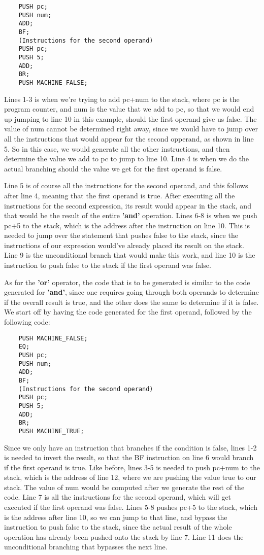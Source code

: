 \documentclass{article}
\begin{document}
\begin{lstlisting}
    PUSH pc;
    PUSH num;
    ADD;
    BF;
    (Instructions for the second operand)
    PUSH pc;
    PUSH 5;
    ADD;
    BR;
    PUSH MACHINE_FALSE;
\end{lstlisting}

Lines 1-3 is when we're trying to add pc+num to the stack, where pc is the program counter, and num is the value that we add to pc, so that we would end up jumping to line 10 in this example, should the first operand give us false. The value of num cannot be determined right away, since we would have to jump over all the instructions that would appear for the second opperand, as shown in line 5. So in this case, we would generate all the other instructions, and then determine the value we add to pc to jump to line 10. Line 4 is when we do the actual branching should the value we get for the first operand is false.

Line 5 is of course all the instructions for the second operand, and this follows after line 4, meaning that the first operand is true. After executing all the instructions for the second expression, its result would appear in the stack, and that would be the result of the entire \textbf{'and'} operation. Lines 6-8 is when we push pc+5 to the stack, which is the address after the instruction on line 10. This is needed to jump over the statement that pushes false to the stack, since the instructions of our expression would've already placed its result on the stack. Line 9 is the unconditional branch that would make this work, and line 10 is the instruction to push false to the stack if the first operand was false.

As for the \textbf{'or'} operator, the code that is to be generated is similar to the code generated for \textbf{'and'}, since one requires going through both operands to determine if the overall result is true, and the other does the same to determine if it is false. We start off by having the code generated for the first operand, followed by the following code:

\begin{lstlisting}
    PUSH MACHINE_FALSE;
    EQ;
    PUSH pc;
    PUSH num;
    ADD;
    BF;
    (Instructions for the second operand)
    PUSH pc;
    PUSH 5;
    ADD;
    BR;
    PUSH MACHINE_TRUE;
\end{lstlisting}

Since we only have an instruction that branches if the condition is false, lines 1-2 is needed to invert the result, so that the BF instruction on line 6 would branch if the first operand is true. Like before, lines 3-5 is needed to push pc+num to the stack, which is the address of line 12, where we are pushing the value true to our stack. The value of num would be computed after we generate the rest of the code. Line 7 is all the instructions for the second operand, which will get executed if the first operand was false. Lines 5-8 pushes pc+5 to the stack, which is the address after line 10, so we can jump to that line, and bypass the instruction to push false to the stack, since the actual result of the whole  operation has already been pushed onto the stack by line 7. Line 11 does the unconditional branching that bypasses the next line.
\end{document}
